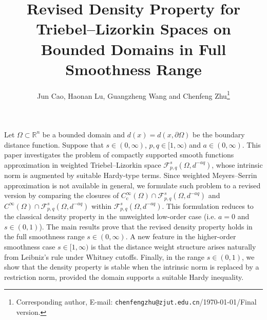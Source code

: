 \documentclass[11pt,twoside]{article}
\theoremstyle{mylem}
\theoremstyle{definition}
\numberwithin{equation}{section}
\begin{document}
\arraycolsep=1pt
\title{\bf Revised Density Property for  Triebel--Lizorkin Spaces on Bounded  Domains 
in Full Smoothness Range
}
\author{Jun Cao, Haonan Lu, Guangzheng Wang and Chenfeng Zhu\footnote{Corresponding author,
E-mail: \texttt{chenfengzhu@zjut.edu.cn}/{\color{red}\today}/Final version.}}
\date{}
\maketitle

\vspace{-0.8cm}

\begin{center}
\begin{minipage}{13cm}\small
{
Let $\Omega\subset\mathbb{R}^n$ be  a bounded domain and
$d(x)=d(x,\partial\Omega)$ be the boundary distance function.
Suppose that $s\in(0,\infty)$, $p,q\in[1,\infty)$ and $a\in(0,\infty)$.
This paper investigates the problem of compactly supported smooth functions approximation in 
weighted Triebel--Lizorkin space $\mathcal{F}_{p,q}^{s}(\Omega,d^{-aq})$, whose intrinsic norm is  
augmented by suitable Hardy-type terms. Since weighted 
Meyers--Serrin approximation is not available in general,
we formulate such problem to a revised version by comparing the closures of 
$C_{\mathrm{c}}^\infty(\Omega)\cap\mathcal{F}_{p,q}^{s}(\Omega,d^{-aq})$
and $C^\infty(\Omega)\cap\mathcal{F}_{p,q}^{s}(\Omega,d^{-aq})$ within $\mathcal{F}_{p,q}^{s}(\Omega,d^{-aq})$.
This formulation reduces to the classical density property in the unweighted low-order case (i.e. $a=0$ and $s\in(0,1)$). 
The main results prove that the revised density property holds in the full smoothness range $s\in(0,\infty)$.
A new feature in the higher-order smoothness
case $s\in [1,\infty)$ is that the distance weight structure arises naturally from Leibniz's rule under Whitney cutoffs. 
Finally, in the range $s\in(0,1)$, 
we show that the density property is stable when the intrinsic norm is replaced by a restriction norm,
provided the domain supports a suitable Hardy inequality.
}
\end{minipage}
\end{center}

\end{document}
